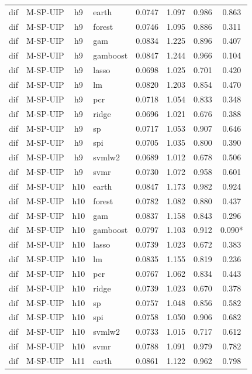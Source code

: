 \begin{ThreePartTable}
\begin{longtable}[t]{llclcccc}
dif & M-SP-UIP & h9 & earth & 0.0747 & 1.097 & 0.986 & 0.863\\
dif & M-SP-UIP & h9 & forest & 0.0746 & 1.095 & 0.886 & 0.311\\
dif & M-SP-UIP & h9 & gam & 0.0834 & 1.225 & 0.896 & 0.407\\
dif & M-SP-UIP & h9 & gamboost & 0.0847 & 1.244 & 0.966 & 0.104\\
dif & M-SP-UIP & h9 & lasso & 0.0698 & 1.025 & 0.701 & 0.420\\
dif & M-SP-UIP & h9 & lm & 0.0820 & 1.203 & 0.854 & 0.470\\
dif & M-SP-UIP & h9 & pcr & 0.0718 & 1.054 & 0.833 & 0.348\\
dif & M-SP-UIP & h9 & ridge & 0.0696 & 1.021 & 0.676 & 0.388\\
dif & M-SP-UIP & h9 & sp & 0.0717 & 1.053 & 0.907 & 0.646\\
dif & M-SP-UIP & h9 & spi & 0.0705 & 1.035 & 0.800 & 0.390\\
dif & M-SP-UIP & h9 & svmlw2 & 0.0689 & 1.012 & 0.678 & 0.506\\
dif & M-SP-UIP & h9 & svmr & 0.0730 & 1.072 & 0.958 & 0.601\\
\addlinespace
dif & M-SP-UIP & h10 & earth & 0.0847 & 1.173 & 0.982 & 0.924\\
dif & M-SP-UIP & h10 & forest & 0.0782 & 1.082 & 0.880 & 0.437\\
dif & M-SP-UIP & h10 & gam & 0.0837 & 1.158 & 0.843 & 0.296\\
dif & M-SP-UIP & h10 & gamboost & 0.0797 & 1.103 & 0.912 & 0.090*\\
dif & M-SP-UIP & h10 & lasso & 0.0739 & 1.023 & 0.672 & 0.383\\
dif & M-SP-UIP & h10 & lm & 0.0835 & 1.155 & 0.819 & 0.236\\
dif & M-SP-UIP & h10 & pcr & 0.0767 & 1.062 & 0.834 & 0.443\\
dif & M-SP-UIP & h10 & ridge & 0.0739 & 1.023 & 0.670 & 0.378\\
dif & M-SP-UIP & h10 & sp & 0.0757 & 1.048 & 0.856 & 0.582\\
dif & M-SP-UIP & h10 & spi & 0.0758 & 1.050 & 0.906 & 0.682\\
dif & M-SP-UIP & h10 & svmlw2 & 0.0733 & 1.015 & 0.717 & 0.612\\
dif & M-SP-UIP & h10 & svmr & 0.0788 & 1.091 & 0.979 & 0.782\\
\addlinespace
dif & M-SP-UIP & h11 & earth & 0.0861 & 1.122 & 0.962 & 0.798\\

\end{longtable}
\end{ThreePartTable}
